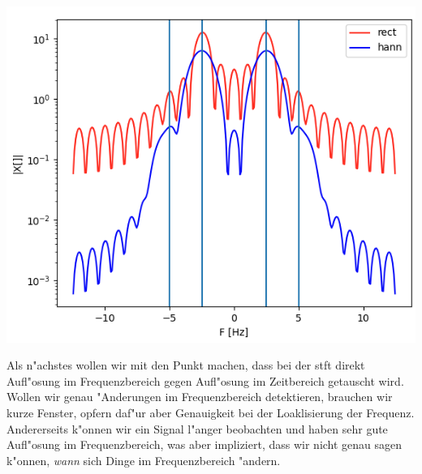 \begin{listing}[ht]
    \noindent
    \begin{minipage}{0.51\textwidth}
        \strut\vspace*{-\baselineskip}\newline
        \inputminted[firstline=5, lastline=22]{python3}{code/stft_win.py}
    \end{minipage}%
    \begin{minipage}{0.48\textwidth}
        \strut\vspace*{-\baselineskip}\newline
        \includegraphics[width=\textwidth]{code/stft_win.png}
    \end{minipage}
    \label{py:stft_win}
\end{listing}
%
%
\clearpage
Als n"achstes wollen wir mit  den Punkt machen, dass bei der \gls{stft} direkt Aufl"osung im Frequenzbereich gegen Aufl"osung im Zeitbereich getauscht wird.
Wollen wir genau "Anderungen im Frequenzbereich detektieren, brauchen wir kurze Fenster, opfern daf"ur aber Genauigkeit bei der Loaklisierung der Frequenz.
Andererseits k"onnen wir ein Signal l"anger beobachten und haben sehr gute Aufl"osung im Frequenzbereich, was aber impliziert, dass wir nicht genau sagen k"onnen, \emph{wann} sich Dinge im Frequenzbereich "andern.

